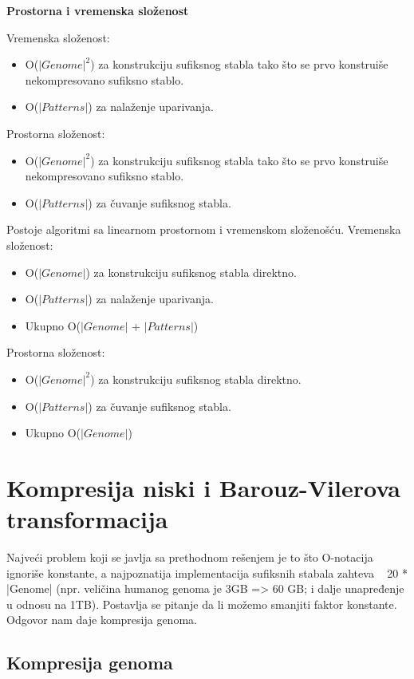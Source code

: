 \textbf{Prostorna i vremenska složenost}


Vremenska složenost: 
\begin{itemize}
\item O($|Genome|^2$) za konstrukciju sufiksnog stabla tako što se prvo konstruiše nekompresovano sufiksno stablo.
\item O($|Patterns|$) za nalaženje uparivanja.
\end{itemize}
Prostorna složenost:
\begin{itemize}
\item O($|Genome|^2$) za konstrukciju sufiksnog stabla tako što se prvo konstruiše nekompresovano sufiksno stablo.
\item O($|Patterns|$) za čuvanje sufiksnog stabla.
\end{itemize}




Postoje algoritmi sa linearnom prostornom i vremenskom složenošću.
Vremenska složenost: 
\begin{itemize}
\item O($|Genome|$) za konstrukciju sufiksnog stabla direktno.
\item O($|Patterns|$) za nalaženje uparivanja.
\item Ukupno O($|Genome|$ + $|Patterns|$)
\end{itemize}
Prostorna složenost:
\begin{itemize}
\item O($|Genome|^2$) za konstrukciju sufiksnog stabla direktno.
\item O($|Patterns|$) za čuvanje sufiksnog stabla.
\item Ukupno O($|Genome|$)
\end{itemize}

\section{Kompresija niski i Barouz-Vilerova transformacija}

Najveći problem koji se javlja sa prethodnom rešenjem je to što O-notacija ignoriše konstante, a najpoznatija implementacija sufiksnih stabala zahteva ~ 20 * |Genome| (npr. veličina humanog genoma je 3GB => 60 GB; i dalje unapređenje u odnosu na 1TB). Postavlja se pitanje da li možemo smanjiti faktor konstante. Odgovor nam daje kompresija genoma.

\subsection{Kompresija genoma}

